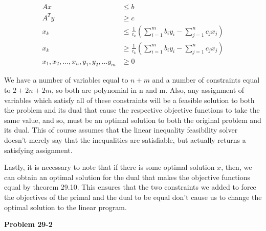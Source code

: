\documentclass{article}
\begin{document}
\begin{enumerate}[a.]
\begin{align*}
Ax&\le b\\
A^T y &\ge c\\
x_k &\le \frac{1}{c_k} \left(\sum_{i=1}^m b_i y_i - \sum_{j=1}^n c_j x_j\right)\\
x_k &\ge \frac{1}{c_k} \left(\sum_{i=1}^m b_i y_i - \sum_{j=1}^n c_j x_j\right)\\
x_1,x_2,\ldots,x_n,y_1,y_2,\ldots y_m &\ge 0
\end{align*}

We have a number of variables equal to $n+m$ and a number of constraints equal to $2 + 2n +2m$, so both are polynomial in n and m. Also, any assignment of variables which satisfy all of these constraints will be a feasible solution to both the problem and its dual that cause the respective objective functions to take the same value, and so, must be an optimal solution to both the original problem and its dual. This of course assumes that the linear inequality feasibility solver doesn't merely say that the inequalities are satisfiable, but actually returns a satisfying assignment.

Lastly, it is necessary to note that if there is some optimal solution $x$, then, we can obtain an optimal solution for the dual that makes the objective functions equal by theorem 29.10. This ensures that the two constraints we added to force the objectives of the primal and the dual to be equal don't cause us to change the optimal solution to the linear program.
\end{enumerate}

\noindent\textbf{Problem 29-2}\\
\end{document}
